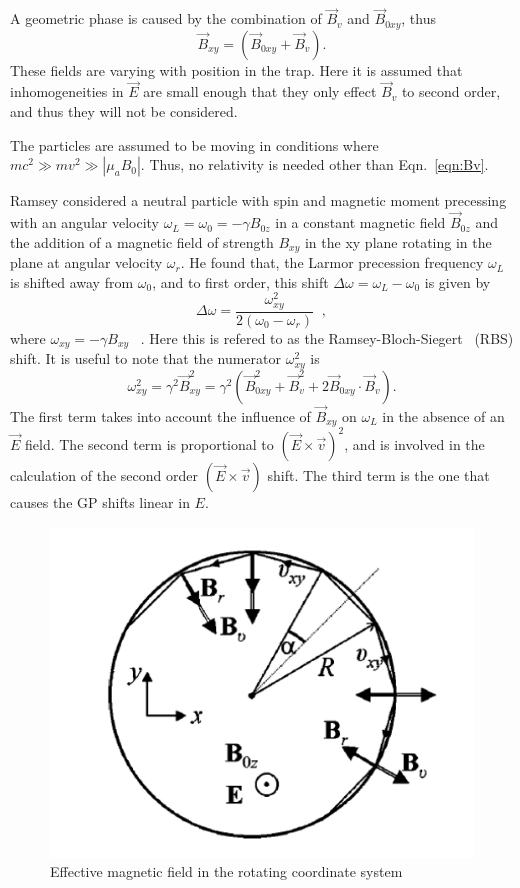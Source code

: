 A geometric phase is caused by the combination of $\vec{B}_v$ and
$\vec{B}_{0xy}$, thus
%
\begin{equation}
\vec{B}_{xy} = (\vec{B}_{0xy} + \vec{B}_v) .
\end{equation}
%
These fields are varying with position in the trap.  Here it is
assumed that inhomogeneities in $\vec{E}$ are small enough that they
only effect $\vec{B}_v$ to second order, and thus they will not be
considered.

The particles are assumed to be moving in conditions where
$m c^2 \gg m v^2 \gg |\mu_a B_0|$.  Thus, no relativity is needed
other than Eqn.~\ref{eqn:Bv}.


%
%
%

Ramsey considered a neutral particle with spin and magnetic moment
precessing with an angular velocity
$\omega_L = \omega_0 = -\gamma B_{0z}$ in a constant magnetic field
$\vec{B}_{0z}$ and the addition of a magnetic field of strength
$B_{xy}$ in the xy plane rotating in the plane at angular velocity
$\omega_r$.  He found that, the Larmor precession frequency $\omega_L$
is shifted away from $\omega_0$, and to first order, this shift
$\Delta \omega = \omega_L - \omega_0$ is given by
%
\begin{equation}
\Delta \omega = \frac{\omega_{xy}^2}{2(\omega_0 - \omega_r)} \;\; ,
\end{equation}
%
where $\omega_{xy} = -\gamma B_{xy}$ ~\cite{ramsey1955}. Here this is
refered to as the Ramsey-Bloch-Siegert ~(RBS) shift.  It is useful to
note that the numerator $\omega_{xy}^2$ is
%
\begin{equation}
\omega_{xy}^2 = \gamma^2 \vec{B}_{xy}^2 =\gamma^2(\vec{B}_{0xy}^2 + \vec{B}_{v}^2 + 2 \vec{B}_{0xy}\cdot\vec{B}_{v}) .
\end{equation}
The first term takes into account the influence of $\vec{B}_{xy}$ on
$\omega_L$ in the absence of an $\vec{E}$ field.  The second term is
proportional to $(\vec{E}\times\vec{v})^2$, and is involved in the
calculation of the second order $(\vec{E}\times\vec{v})$ shift.  The
third term is the one that causes the GP shifts linear in $E$.

\begin{figure}[h!]
\label{fig:trap}
  \centering
    \includegraphics[width=.5\textwidth]{trap.png}
    \caption{Effective magnetic field in the rotating coordinate system}
\end{figure}

